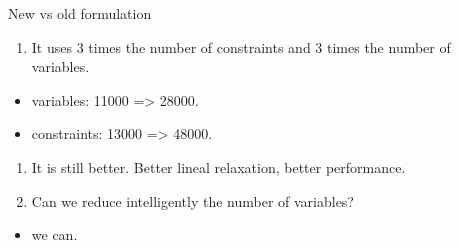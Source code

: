 \begin{frame}
  \begin{block}{New vs old formulation}

  \begin{enumerate}[<+->]

  \item
    It uses 3 times the number of constraints and 3 times the number of
    variables.
  \end{enumerate}

  \begin{itemize}[<+->]

  \item
    variables: 11000 =\textgreater{} 28000.
  \item
    constraints: 13000 =\textgreater{} 48000.
  \end{itemize}

  \begin{enumerate}[<+->]

  \item
    It is still better. Better lineal relaxation, better performance.
  \item
    Can we reduce intelligently the number of variables?
  \end{enumerate}

  \begin{itemize}[<+->]

  \item
    we can.
  \end{itemize}

  \end{block}

\end{frame}

